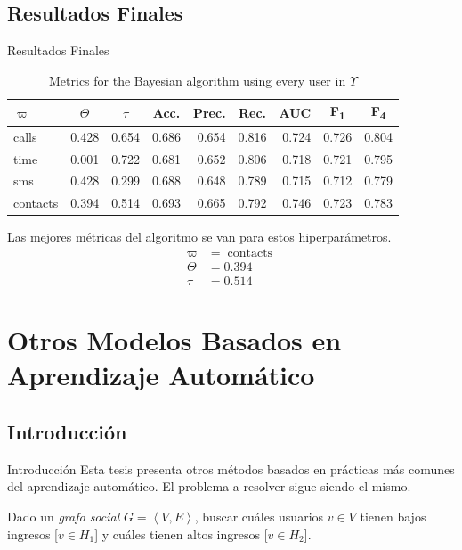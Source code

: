 \documentclass[usenames,dvipsnames,table]{beamer}
\DeclareMathOperator{\contacts}{contacts}
\newcommand{\ct}[1]{\multicolumn{1}{c}{#1}}
\begin{document}
\subsection{Resultados Finales}

\begin{frame}{Resultados Finales}
	\begin{table}
		\begin{tabular}{l r r r r r r r r}
			\toprule
			$\varpi$ & \ct{$\Theta$} & \ct{$\tau$} & \ct{Acc.} & \ct{Prec.} & \ct{Rec.} & \ct{AUC} & \ct{F\textsubscript{1}} & \ct{F\textsubscript{4}} \\
			\midrule
			calls    & 0.428 & 0.654 & 0.686 & 0.654 & 0.816 & 0.724 & 0.726 & 0.804 \\
			time     & 0.001 & 0.722 & 0.681 & 0.652 & 0.806 & 0.718 & 0.721 & 0.795 \\
			sms      & 0.428 & 0.299 & 0.688 & 0.648 & 0.789 & 0.715 & 0.712 & 0.779 \\
			contacts & 0.394 & 0.514 & 0.693 & 0.665 & 0.792 & 0.746 & 0.723 & 0.783 \\
			\bottomrule
		\end{tabular}
		\caption{Metrics for the Bayesian algorithm using every user in $\Upsilon$}
	\end{table}

	\pause{}
	Las mejores métricas del algoritmo se van para estos hiperparámetros.
	\begin{align*}
		\varpi &= \contacts \\
		\Theta &= 0.394 \\
		\tau &= 0.514
	\end{align*}
\end{frame}

\section{Otros Modelos Basados en Aprendizaje Automático}

\subsection{Introducción}

\begin{frame}{Introducción}
	Esta tesis presenta otros métodos basados en prácticas más comunes del aprendizaje automático. El problema a resolver sigue siendo el mismo.

	\begin{block}{}
		Dado un \emph{grafo social} $G = \left< V, E \right>$, buscar cuáles usuarios $v \in V$ tienen bajos ingresos [$v \in H_1$] y cuáles tienen altos ingresos [$v \in H_2$].
	\end{block}

\end{frame}
\end{document}
